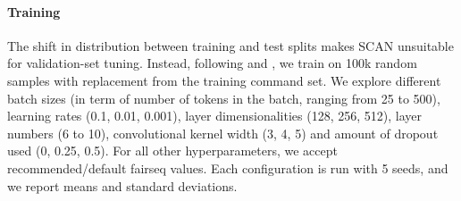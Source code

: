 \paragraph{Training} The shift in distribution between training and
test splits makes SCAN unsuitable for validation-set tuning. Instead,
following  and , we
train on 100k random samples with replacement from the
training command set. We explore different batch sizes (in term of number of tokens in the
batch, ranging from 25 to 500), learning rates (0.1, 0.01, 0.001), layer dimensionalities
(128, 256, 512), layer numbers (6 to 10), convolutional
kernel width (3, 4, 5) and amount of dropout used (0, 0.25, 0.5).
For all other hyperparameters, we accept recommended/default fairseq values. Each configuration is run with 5
seeds, and we report means and standard deviations.

